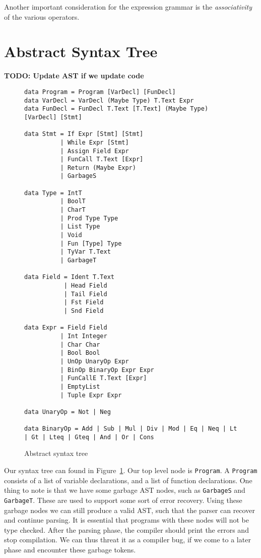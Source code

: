 Another important consideration for the expression grammar is the
\emph{associativity} of the various operators.



\section{Abstract Syntax Tree}
\textbf{TODO: Update AST if we update code}
\begin{figure}
\begin{verbatim}
data Program = Program [VarDecl] [FunDecl]
data VarDecl = VarDecl (Maybe Type) T.Text Expr
data FunDecl = FunDecl T.Text [T.Text] (Maybe Type) [VarDecl] [Stmt]

data Stmt = If Expr [Stmt] [Stmt]
          | While Expr [Stmt]
          | Assign Field Expr
          | FunCall T.Text [Expr]
          | Return (Maybe Expr)
          | GarbageS

data Type = IntT
          | BoolT
          | CharT
          | Prod Type Type
          | List Type
          | Void
          | Fun [Type] Type
          | TyVar T.Text
          | GarbageT

data Field = Ident T.Text
           | Head Field
           | Tail Field
           | Fst Field
           | Snd Field

data Expr = Field Field
          | Int Integer
          | Char Char
          | Bool Bool
          | UnOp UnaryOp Expr
          | BinOp BinaryOp Expr Expr
          | FunCallE T.Text [Expr]
          | EmptyList
          | Tuple Expr Expr

data UnaryOp = Not | Neg

data BinaryOp = Add | Sub | Mul | Div | Mod | Eq | Neq | Lt | Gt | Lteq | Gteq | And | Or | Cons
\end{verbatim}
	\caption{Abstract syntax tree}\label{fig:ast}
\end{figure}
Our syntax tree can found in Figure~\ref{fig:ast}.
Our top level node is \texttt{Program}.
A \texttt{Program} consists of a list of variable declarations,
and a list of function declarations.
One thing to note is that we have some garbage AST nodes, such as \texttt{GarbageS} and \texttt{GarbageT}.
These are used to support some sort of error recovery.
Using these garbage nodes we can still produce a valid AST,
such that the parser can recover and continue parsing.
It is essential that programs with these nodes will not be type checked.
After the parsing phase, the compiler should print the errors and stop compilation.
We can thus threat it as a compiler bug, if we come to a later phase and encounter these garbage tokens.

